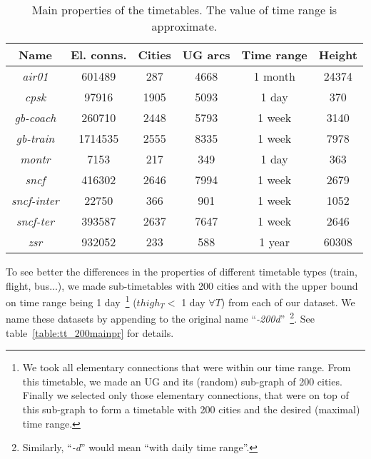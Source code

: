 	\begin{table}[h!]
		\centering
		\small
		\begin{tabular}{c|c|c|c|c|c}
			\rowcolor{tablehead}
			\textbf{Name} & \textbf{El. conns.} & \textbf{Cities} & \textbf{UG arcs} & \textbf{Time range} & \textbf{Height} \\
			\hline
			\textit{air01} & 601489 & 287 & 4668 & 1 month & 24374 \\
			\textit{cpsk} & 97916 & 1905 & 5093 & 1 day & 370 \\
			\textit{gb-coach} & 260710 & 2448 & 5793 & 1 week & 3140 \\
			\textit{gb-train} & 1714535 & 2555 & 8335 & 1 week & 7978 \\
			\textit{montr} & 7153 & 217 & 349  & 1 day & 363 \\
			\textit{sncf} & 416302 & 2646 & 7994 & 1 week & 2679 \\
			\textit{sncf-inter} & 22750 & 366 & 901 & 1 week & 1052 \\
			\textit{sncf-ter} & 393587 & 2637 & 7647 & 1 week & 2646 \\
			\textit{zsr} & 932052 & 233 & 588 & 1 year & 60308 \\
		\end{tabular}
		\caption{\label{table:tt_mainpr} Main properties of the timetables. The value of time range is approximate.}
		\normalsize
	\end{table}	
	
	\noindent To see better the differences in the properties of different timetable types (train, flight, bus...), we made sub-timetables with 200 cities and with the upper bound on time range being 1 day~\footnote{We took all elementary connections that were within our time range. From this timetable, we made an UG and its (random) sub-graph of 200 cities. Finally we selected only those elementary connections, that were on top of this sub-graph to form a timetable with 200 cities and the desired (maximal) time range.} ($thigh_{T} <$ 1 day $\forall T$) from each of our dataset. We name these datasets by appending to the original name ``\textit{-200d}''~\footnote{Similarly, ``\textit{-d}'' would mean ``with daily time range''.}. See table~\ref{table:tt_200mainpr} for details. \\
	
